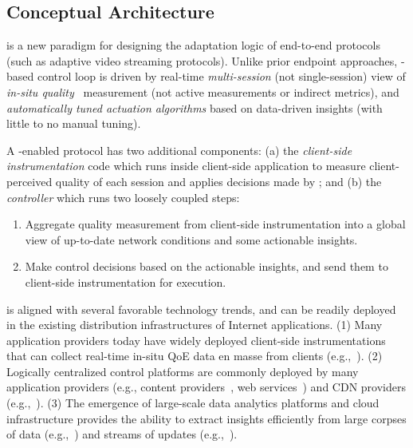 \subsection{Conceptual Architecture}
\label{subsec:overview:concept}

\ddn is a new paradigm for designing the adaptation logic of 
end-to-end protocols (such as adaptive video streaming protocols). 
Unlike prior endpoint approaches, 
\ddn-based control loop is driven by real-time
{\em multi-session} (not single-session) view of 
{\em in-situ quality}~\cite{insitu} 
measurement (not active
measurements or indirect metrics), 
and {\em automatically tuned actuation algorithms} based
on data-driven insights (with little to no manual tuning).

A \ddn-enabled protocol has two additional components:
(a) the {\em client-side instrumentation} code which runs inside 
client-side application to measure client-perceived quality of 
each session and applies decisions made by \ddn; and 
(b) the {\em \ddn controller} which runs two loosely coupled steps:
\begin{enumerate}
\item Aggregate quality measurement from client-side 
instrumentation into a global view of up-to-date network conditions and 
some actionable insights.
\item Make control decisions based on the actionable insights, 
and send them to client-side instrumentation for execution.
\end{enumerate}


\ddn is aligned with several favorable technology trends, and can be 
readily deployed in the existing distribution infrastructures of Internet applications.
(1) Many application providers today have widely deployed client-side 
instrumentations that can collect real-time in-situ QoE data 
en masse from clients (e.g.,~\cite{sigcomm11,via,akamai-imc12,artizanetworks}). 
(2) Logically centralized control platforms are commonly deployed by many 
application providers (e.g., content providers~\cite{c3}, web services~\cite{footprint}) and CDN providers (e.g.,~\cite{chen2015end,mukerjee2015practical}).
(3) The emergence of large-scale data analytics platforms and cloud infrastructure 
provides the ability to extract insights efficiently from large corpses 
of data (e.g.,~\cite{spark}) and streams of updates 
(e.g.,~\cite{zaharia2013discretized}). 



